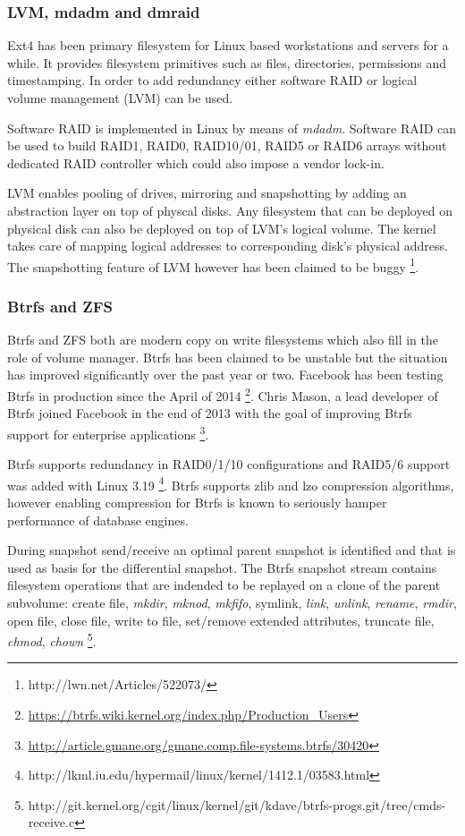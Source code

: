 \documentclass{article}
\begin{document}
\subsubsection{LVM, mdadm and dmraid}

Ext4 has been primary filesystem for Linux based workstations and
servers for a while. It provides filesystem primitives such as files,
directories, permissions and timestamping.
In order to add redundancy
either software RAID or logical volume management (LVM) can be used.

Software RAID is implemented in Linux by means of \emph{mdadm}.
Software RAID can be used to build RAID1, RAID0, RAID10/01, RAID5
or RAID6 arrays without dedicated RAID controller which could also
impose a vendor lock-in.

LVM enables pooling of drives, mirroring and snapshotting by adding
an abstraction layer on top of physcal disks. Any filesystem that
can be deployed on physical disk can also be deployed on top of
LVM's logical volume. The kernel takes care of mapping logical
addresses to corresponding disk's physical address.
The snapshotting feature of LVM however has been claimed to be buggy
\footnote{http://lwn.net/Articles/522073/}.

\subsubsection{Btrfs and ZFS}

Btrfs and ZFS both are modern copy on write filesystems
which also fill in the role of volume manager.
Btrfs has been claimed to be unstable but the situation has
improved significantly over the past year or two.
Facebook has been testing Btrfs in production since the April of 2014
\footnote{\url{https://btrfs.wiki.kernel.org/index.php/Production_Users}}.
Chris Mason, a lead developer of Btrfs joined Facebook
in the end of 2013 with the goal of improving Btrfs support
for enterprise applications
\footnote{\url{http://article.gmane.org/gmane.comp.file-systems.btrfs/30420}}.

Btrfs supports redundancy in RAID0/1/10 configurations and
RAID5/6 support was added with Linux 3.19
\footnote{http://lkml.iu.edu/hypermail/linux/kernel/1412.1/03583.html}.
Btrfs supports zlib and lzo compression algorithms,
however enabling compression for Btrfs is known to
seriously hamper performance of database engines.

During snapshot send/receive an optimal parent snapshot is
identified and that is used as basis for the differential snapshot.
The Btrfs snapshot stream contains filesystem operations that are
indended to be replayed on a clone of the parent subvolume:
create file, \emph{mkdir}, \emph{mknod}, \emph{mkfifo}, symlink,
\emph{link}, \emph{unlink}, \emph{rename}, \emph{rmdir}, open file,
close file, write to file, set/remove extended attributes,
truncate file, \emph{chmod}, \emph{chown}
\footnote{http://git.kernel.org/cgit/linux/kernel/git/kdave/btrfs-progs.git/tree/cmds-receive.c}.
\end{document}
